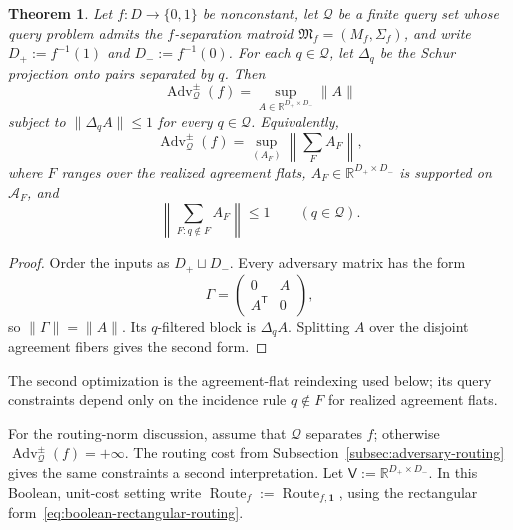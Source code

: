 \documentclass[11pt]{article}
\numberwithin{equation}{section}
\newtheorem{theorem}[definition]{Theorem}
\theoremstyle{remark}
\begin{document}
\begin{theorem}
\label{thm:flat-adversary-decomposition}
Let $f:D\to\{0,1\}$ be nonconstant, let $\mathcal Q$ be a finite query set
whose query problem admits the $f$-separation matroid
$\mathfrak M_f=(M_f,\Sigma_f)$, and write
$D_+:=f^{-1}(1)$ and $D_-:=f^{-1}(0)$. For each $q\in\mathcal Q$, let
$\Delta_q$ be the Schur projection onto pairs separated by $q$. Then
\begin{equation}
    \operatorname{Adv}^{\pm}_{\mathcal Q}(f)
    =
    \sup_{A\in\mathbb R^{D_+\times D_-}}\|A\|
\end{equation}
subject to $\|\Delta_qA\|\leq1$ for every $q\in\mathcal Q$. Equivalently,
\begin{equation}
    \operatorname{Adv}^{\pm}_{\mathcal Q}(f)
    =
    \sup_{(A_F)}
        \left\|\sum_FA_F\right\|,
\end{equation}
where $F$ ranges over the realized agreement flats,
$A_F\in\mathbb R^{D_+\times D_-}$ is supported on $\mathcal A_F$, and
\begin{equation}
    \left\|\sum_{F:q\notin F}A_F\right\|\leq1
    \qquad(q\in\mathcal Q).
\end{equation}
\end{theorem}

\begin{proof}
Order the inputs as $D_+\sqcup D_-$.  Every adversary matrix has the form
\begin{equation}
    \Gamma=
    \begin{pmatrix}0&A\\A^{\mathsf T}&0\end{pmatrix},
\end{equation}
so $\|\Gamma\|=\|A\|$.  Its $q$-filtered block is $\Delta_qA$.  Splitting
$A$ over the disjoint agreement fibers gives the second form.
\end{proof}

The second optimization is the agreement-flat reindexing used below; its
query constraints depend only on the incidence rule $q\notin F$ for realized
agreement flats.


For the routing-norm discussion, assume that $\mathcal Q$ separates $f$; otherwise $\operatorname{Adv}^{\pm}_{\mathcal Q}(f)=+\infty$. The routing cost from Subsection~\ref{subsec:adversary-routing} gives the same constraints a second interpretation.  Let $\mathsf V:=\mathbb R^{D_+\times D_-}$.  In this
Boolean, unit-cost setting write $\operatorname{Route}_f:=\operatorname{Route}_{f,\mathbf 1}$, using the
rectangular form~\eqref{eq:boolean-rectangular-routing}.
\end{document}

